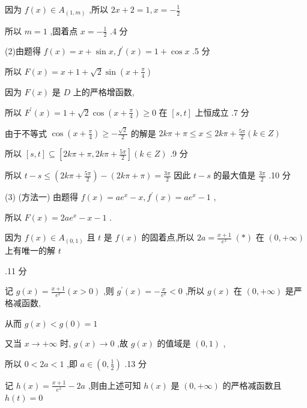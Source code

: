 \documentclass[10pt]{article}
\begin{document}
因为 \(f\left( x\right)  \in  {A}_{\left( 1,m\right) }\) ,所以 \({2x} + 2 = 1,x =  - \frac{1}{2}\)

所以 \(m = 1\) ,固着点 \(x =  - \frac{1}{2}\) .4 分

(2)由题得 \(f\left( x\right)  = x + \sin x,{f}^{\prime }\left( x\right)  = 1 + \cos x\) .5 分

所以 \(F\left( x\right)  = x + 1 + \sqrt{2}\sin \left( {x + \frac{\pi }{4}}\right)\)

因为 \(F\left( x\right)\) 是 \(D\) 上的严格增函数,

所以 \({F}^{\prime }\left( x\right)  = 1 + \sqrt{2}\cos \left( {x + \frac{\pi }{4}}\right)  \geq  0\) 在 \(\left\lbrack  {s,t}\right\rbrack\) 上恒成立 .7 分

由于不等式 \(\cos \left( {x + \frac{\pi }{4}}\right)  \geq   - \frac{\sqrt{2}}{2}\) 的解是 \({2k\pi } + \pi  \leq  x \leq  {2k\pi } + \frac{5\pi }{2}\left( {k \in  Z}\right)\)

所以 \(\left\lbrack  {s,t}\right\rbrack   \subseteq  \left\lbrack  {{2k\pi } + \pi ,{2k\pi } + \frac{5\pi }{2}}\right\rbrack  \left( {k \in  Z}\right)\) .9 分

所以 \(t - s \leq  \left( {{2k\pi } + \frac{5\pi }{2}}\right)  - \left( {{2k\pi } + \pi }\right)  = \frac{3\pi }{2}\) 因此 \(t - s\) 的最大值是 \(\frac{3\pi }{2}\) .10 分

(3) (方法一) 由题得 \(f\left( x\right)  = a{e}^{x} - x,{f}^{\prime }\left( x\right)  = a{e}^{x} - 1\) ,

所以 \(F\left( x\right)  = {2a}{e}^{x} - x - 1\) .

因为 \(f\left( x\right)  \in  {A}_{\left( 0,1\right) }\) 且 \(t\) 是 \(f\left( x\right)\) 的固着点,所以 \({2a} = \frac{x + 1}{{e}^{x}}\;\left( *\right)\) 在 \(\left( {0, + \infty }\right)\) 上有唯一的解 \(t\)

.11 分

记 \(g\left( x\right)  = \frac{x + 1}{{e}^{x}}\left( {x > 0}\right)\) ,则 \({g}^{\prime }\left( x\right)  =  - \frac{x}{{e}^{x}} < 0\) ,所以 \(g\left( x\right)\) 在 \(\left( {0, + \infty }\right)\) 是严格减函数,

从而 \(g\left( x\right)  < g\left( 0\right)  = 1\)

又当 \(x \rightarrow   + \infty\) 时, \(g\left( x\right)  \rightarrow  0\) ,故 \(g\left( x\right)\) 的值域是 \(\left( {0,1}\right)\) ,

所以 \(0 < {2a} < 1\) ,即 \(a \in  \left( {0,\frac{1}{2}}\right)\) .13 分

记 \(h\left( x\right)  = \frac{x + 1}{{e}^{x}} - {2a}\) ,则由上述可知 \(h\left( x\right)\) 是 \(\left( {0, + \infty }\right)\) 的严格减函数且 \(h\left( t\right)  = 0\)
\end{document}
